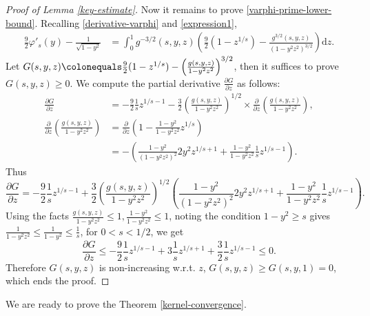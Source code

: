 \documentclass[reqno,10pt]{amsart}
\let\pa=\partial
\let\vf=\varphi
\def\pa{\partial}
\theoremstyle{definition}
\numberwithin{equation}{section}
\begin{document}
\begin{proof}[Proof of Lemma \ref{key-estimate}]
	Now it remains to prove \eqref{varphi-prime-lower-bound}.  
	Recalling \eqref{derivative-varphi} and \eqref{expression1},
		$$
		\begin{aligned}
			\frac{9}{2}\vf'_s(y)-\frac{1}{\sqrt{1-y^2}}&=\int_{0}^{1} g^{-3/2}(s,y,z) \left(\frac{9}{2}(1-z^{1/s})-\frac{g^{3/2}(s,y,z)}{(1-y^2z^2)^{3/2}} \right)\mathrm{d}z.
		\end{aligned}
		$$
		Let $G(s,y,z) \colonequals \frac{9}{2}(1-z^{1/s})-\left(\frac{g(s,y,z)}{1-y^2z^2}\right)^{3/2}$, then 
		 it suffices to prove $G(s,y,z) \geq 0$. We compute the partial derivative $\frac{\pa G}{\pa z}$ as follows:
		$$
		\begin{aligned}
			\frac{\pa G}{\pa z}&=-\frac{9}{2}\frac{1}{s}z^{1/s-1}-\frac{3}{2}\left(\frac{g(s,y,z)}{1-y^2z^2}\right)^{1/2}\times \frac{\pa}{\pa z}\left(\frac{g(s,y,z)}{1-y^2z^2}\right), \\
			\frac{\pa}{\pa z}\left(\frac{g(s,y,z)}{1-y^2z^2}\right)&=\frac{\pa}{\pa z}\left( 1-\frac{1-y^2}{1-y^2z^2}z^{1/s}  \right)\\
			&=-\left(\frac{1-y^2}{(1-y^2z^2)^2}2y^2z^{1/s+1}+\frac{1-y^2}{1-y^2z^2}\frac{1}{s}z^{1/s-1}\right).
		\end{aligned}
		$$
		Thus
		$$\frac{\pa G}{\pa z}=-\frac{9}{2}\frac{1}{s}z^{1/s-1}+\frac{3}{2}\left(\frac{g(s,y,z)}{1-y^2z^2}\right)^{1/2}\left(\frac{1-y^2}{(1-y^2z^2)^2}2y^2z^{1/s+1}+\frac{1-y^2}{1-y^2z^2}\frac{1}{s}z^{1/s-1}\right).$$
		Using the facts $\frac{g(s,y,z)}{1-y^2z^2}\le 1,\frac{1-y^2}{1-y^2z^2}\le 1$, noting the condition $1-y^2 \geq s$ gives
		$\frac{1}{1-y^2z^2}\le \frac{1}{1-y^2}\le \frac{1}{s}$, for $0<s<1/2$,
		we get
		$$\frac{\pa G}{\pa z}\le -\frac{9}{2}\frac{1}{s}z^{1/s-1}+3\frac{1}{s}z^{1/s+1}+\frac{3}{2}\frac{1}{s}z^{1/s-1}\le 0.$$
		Therefore $G(s,y,z)$ is non-increasing w.r.t. $z$, $G(s,y,z)\ge G(s,y,1)=0$, which
	ends the proof.
	\end{proof} 
	
	We are ready to prove the Theorem \ref{kernel-convergence}. 
	
\end{document}
